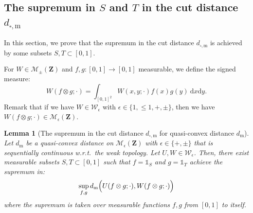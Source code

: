 \documentclass{amsart}
\newcommand{\wrt}{w.r.t.\ }
\theoremstyle{plain}
\newtheorem{lemme}[Th]{Lemma}
\theoremstyle{definition}
\newcommand{\Space}{\mathbf{Z}}
\newcommand{\SignedMeas}{\mathcal{M}_{\pm}(\Space)}
\newcommand{\MeasEps}{\mathcal{M}_{\epsilon}(\Space)}
\newcommand{\KernelEps}{\mathcal{W}_{\epsilon}}
\newcommand{\m}{\mathrm{m}}
\newcommand{\dmeas}{d_\m}
\newcommand{\dcut}{d_{\square,\m}}
\newcommand{\ind}{\mathds{1}}
\newcommand{\drv}{\mathrm{d}}
\begin{document}
\subsection{The supremum in \texorpdfstring{$S$}{} and \texorpdfstring{$T$}{} 
		in the cut distance \texorpdfstring{$\dcut$}{}}

In this section, we prove that the supremum in the cut distance $\dcut$
	is achieved by some subsets $S,T\subset [0,1]$.

For $W\in\SignedMeas$ and $f,g : [0,1] \to [0,1]$  measurable, 
we	define the signed measure:
\begin{equation*}
W(f \otimes g;\cdot) = \int_{[0,1]^2} W(x,y;\cdot) f(x)g(y) \ \drv x\drv y.
\end{equation*}
Remark that if we have $W\in \KernelEps$ with $\epsilon\in\{ 1, \leq 1, +, \pm\}$,
then we have $W(f \otimes g;\cdot) \in \MeasEps$.

\begin{lemme}[The supremum in the cut distance $\dcut$ for quasi-convex distance $\dmeas$]
	\label{lemma_sup_SxT}
Let $\dmeas$ be a quasi-convex distance on $\MeasEps$ with $\epsilon\in\{  +, \pm\}$
	that is sequentially continuous \wrt the weak topology.
Let $U,W\in\KernelEps$.
Then, there exist measurable subsets $S,T \subset [0,1]$ such that $f = \ind_S$ and $g = \ind_T$
	achieve the supremum in:
\begin{equation*}
\sup_{f,g} \dmeas \Bigl( U(f \otimes g;\cdot), W(f \otimes g;\cdot) \Bigr)
\end{equation*}
where the supremum is taken over measurable functions $f,g$ from $[0,1]$ to itself.
\end{lemme}
\end{document}

